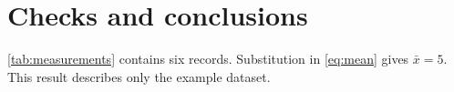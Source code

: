 \section{Checks and conclusions}
\autoref{tab:measurements} contains six records. Substitution in
\eqref{eq:mean} gives $\bar{x}=5$. This result describes only the example dataset.

